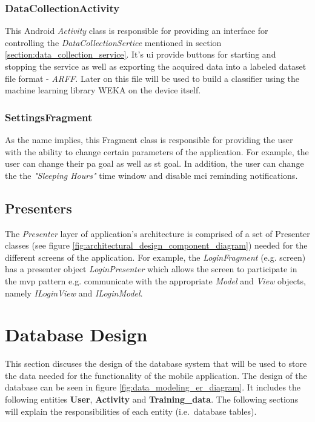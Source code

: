             \subsubsection{DataCollectionActivity}
            This Android \textit{Activity} class is responsible for providing an interface for controlling the \textit{DataCollectionSertice} mentioned in section \ref{section:data_collection_service}. It's \gls{ui} provide buttons for starting and stopping the service as well as exporting the acquired data into a labeled dataset file format - \textit{ARFF}. Later on this file will be used to build a classifier using the machine learning library WEKA on the device itself.
            
            \subsubsection{SettingsFragment}
            As the name implies, this Fragment class is responsible for providing the user with the ability to change certain parameters of the application. For example, the user can change their \gls{pa} goal as well as \gls{st} goal. In addition, the user can change the the \textit{"Sleeping Hours"} time window and disable \gls{mci} reminding notifications.
            
            
        \subsection{Presenters}
        The \textit{Presenter} layer of application's architecture is comprised of a set of Presenter classes (see figure  \ref{fig:architectural_design_component_diagram}) needed for the different screens of the application. For example, the \textit{LoginFragment} (e.g. screen) has a presenter object \textit{LoginPresenter} which allows the screen to participate in the \gls{mvp} pattern e.g. communicate with the appropriate \textit{Model} and \textit{View} objects, namely \textit{ILoginView} and \textit{ILoginModel}.
    
    \section{Database Design}
    \label{section:database-design}
    This section discuses the design of the database system that will be used to store the data needed for the functionality of the mobile application. The design of the database can be seen in figure \ref{fig:data_modeling_er_diagram}. It includes the following entities \textbf{User}, \textbf{Activity} and \textbf{Training\_data}. The following sections will explain the responsibilities of each entity (i.e.\ database tables).
        
